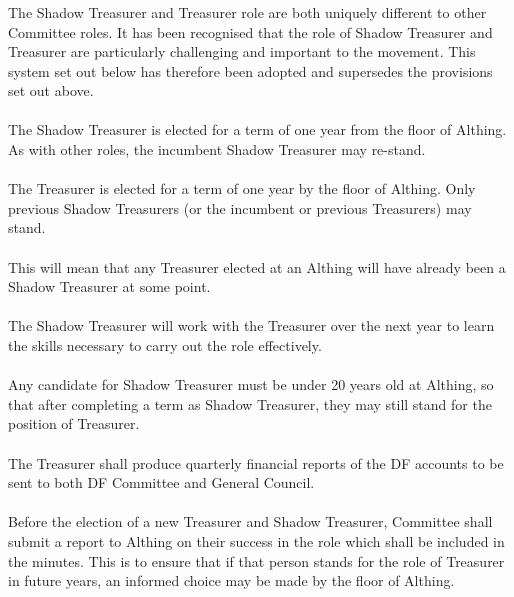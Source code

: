 \documentclass[a4paper, 12pt]{report}
\begin{document}
\subsubsection{}
The Shadow Treasurer and Treasurer role are both uniquely different to other Committee roles. It has been recognised that the role of Shadow Treasurer and Treasurer are particularly challenging and important to the movement. This system set out below has therefore been adopted and supersedes the provisions set out above.
\paragraph{}
The Shadow Treasurer is elected for a term of one year from the floor of Althing. As with other roles, the incumbent Shadow Treasurer may re-stand.
\paragraph{}
The Treasurer is elected for a term of one year by the floor of Althing. Only previous Shadow Treasurers (or the incumbent or previous Treasurers) may stand.
\paragraph{}
This will mean that any Treasurer elected at an Althing will have already been a Shadow Treasurer at some point.
\paragraph{}
The Shadow Treasurer will work with the Treasurer over the next year to learn the skills necessary to carry out the role effectively.
\paragraph{}
Any candidate for Shadow Treasurer must be under 20 years old at Althing, so that after completing a term as Shadow Treasurer, they may still stand for the position of Treasurer.
\paragraph{}
The Treasurer shall produce quarterly financial reports of the DF accounts to be sent to both DF Committee and General Council.
\paragraph{}
\label{sec:treasurerreport}
Before the election of a new Treasurer and Shadow Treasurer, Committee shall submit a report to Althing on their success in the role which shall be included in the minutes. This is to ensure that if that person stands for the role of Treasurer in future years, an informed choice may be made by the floor of Althing.
\end{document}
